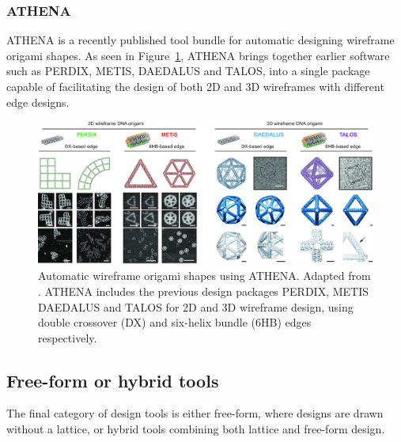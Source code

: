 \subsubsection{ATHENA}

 ATHENA is a recently published tool bundle for automatic designing wireframe origami shapes. As seen in Figure~\ref{fig:athena}, ATHENA brings together earlier software such as PERDIX, METIS, DAEDALUS and TALOS, into a single package capable of facilitating the design of both 2D and 3D wireframes with different edge designs.


\begin{figure}[ht]
  \begin{center}
    \includegraphics[width=\textwidth]{figures/athena.jpeg}
    \caption{Automatic wireframe origami shapes using ATHENA. Adapted from \cite{athena}. ATHENA includes the previous design packages PERDIX, METIS DAEDALUS and TALOS for 2D and 3D wireframe design, using double crossover (DX) and six-helix bundle (6HB) edges respectively. }
    \label{fig:athena}
  \end{center}
\end{figure}


\subsection{Free-form or hybrid tools}
The final category of design tools is either free-form, where designs are drawn without a lattice, or hybrid tools combining both lattice and free-form design. 

